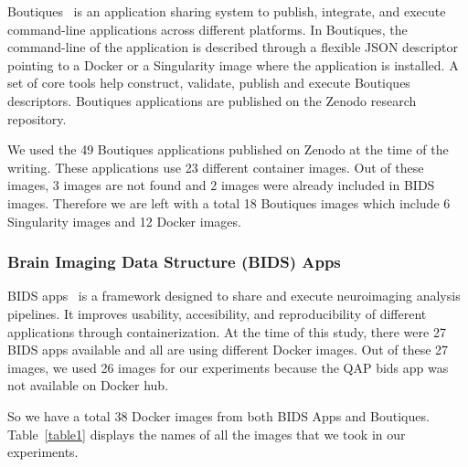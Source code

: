 \documentclass[a4paper,num-refs]{oup-contemporary}
\begin{document}
Boutiques~\cite{glatard2018boutiques} is an application sharing system to
publish, integrate, and execute command-line applications across different
platforms. In Boutiques, the command-line of the application is described
through a flexible JSON descriptor pointing to a Docker or a Singularity
image where the application is installed. A set of core tools help
construct, validate, publish and execute Boutiques descriptors. Boutiques
applications are published on the Zenodo research repository.

We used the 49 Boutiques applications published on Zenodo at the time of
the writing. These applications use 23 different container images. Out of these images,
3 images are not found and 2 images were already included in BIDS images.
Therefore we are left with a total 18 Boutiques images which include 6
Singularity images and 12 Docker images.


\subsubsection{Brain Imaging Data Structure (BIDS) Apps}

BIDS apps~\cite{gorgolewski2017bids} is a framework designed to share and execute neuroimaging
analysis pipelines. It improves usability, accesibility, and reproducibility
of different applications through containerization.
At the time of this study, there were 27 BIDS apps available and all are using different Docker images.
Out of these 27 images, we used 26 images for our experiments because the QAP bids app was not available
on Docker hub.

So we have a total 38 Docker images from both BIDS Apps and Boutiques.
	Table~\ref{table1} displays the names of all the images that we took in our experiments.
\end{document}
